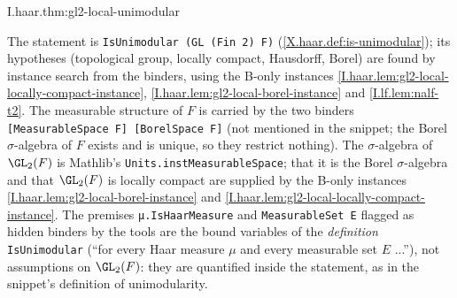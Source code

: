 \begin{theorem}[$\GL_2(F)$ is unimodular]
\end{theorem}
\begin{tfformal}{I.haar.thm:gl2-local-unimodular}
\begin{tffidelity}
The statement is \texttt{IsUnimodular (GL (Fin 2) F)} (\cref{X.haar.def:is-unimodular}); its hypotheses (topological group, locally compact, Hausdorff, Borel) are found by instance search from the binders, using the B-only instances \cref{I.haar.lem:gl2-local-locally-compact-instance}, \cref{I.haar.lem:gl2-local-borel-instance} and \cref{I.lf.lem:nalf-t2}. The measurable structure of $F$ is carried by the two binders \texttt{[MeasurableSpace F] [BorelSpace F]} (not mentioned in the snippet; the Borel $\sigma$-algebra of $F$ exists and is unique, so they restrict nothing). The $\sigma$-algebra of $\GL_2(F)$ is Mathlib's \texttt{Units.instMeasurableSpace}; that it is the Borel $\sigma$-algebra and that $\GL_2(F)$ is locally compact are supplied by the B-only instances \cref{I.haar.lem:gl2-local-borel-instance} and \cref{I.haar.lem:gl2-local-locally-compact-instance}. The premises \texttt{μ.IsHaarMeasure} and \texttt{MeasurableSet E} flagged as hidden binders by the tools are the bound variables of the \emph{definition} \texttt{IsUnimodular} (``for every Haar measure $\mu$ and every measurable set $E$ ...''), not assumptions on $\GL_2(F)$: they are quantified inside the statement, as in the snippet's definition of unimodularity.
\end{tffidelity}
\end{tfformal}
